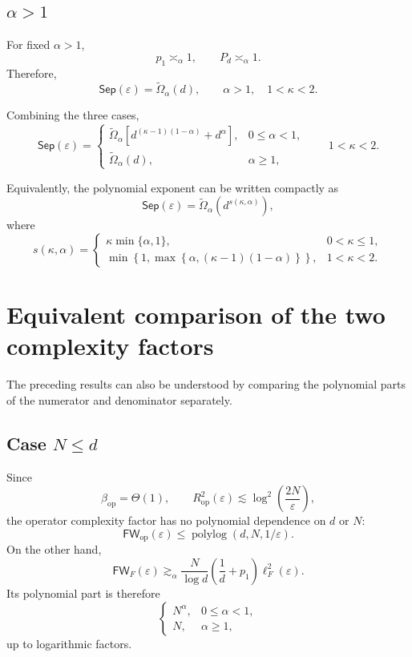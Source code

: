 \documentclass[11pt]{article}
\newcommand{\op}{\mathrm{op}}
\newcommand{\FW}{\mathsf{FW}}
\newcommand{\Sep}{\mathsf{Sep}}
\newcommand{\polylog}{\operatorname{polylog}}
\newcommand{\eps}{\varepsilon}
\begin{document}
\subsection{\texorpdfstring{$\alpha>1$}{alpha greater than one}}

For fixed $\alpha>1$,
\[
p_1\asymp_\alpha1, \qquad P_d\asymp_\alpha1.
\]
Therefore,
\begin{equation}
\boxed{
\Sep(\eps) = \widetilde\Omega_\alpha(d), \qquad \alpha>1,\quad 1<\kappa<2.
}
\label{eq:largeN-alpha-greater1}
\end{equation}

Combining the three cases,
\begin{equation}
\boxed{
\Sep(\eps) =
\begin{cases}
\widetilde\Omega_\alpha\left[ d^{(\kappa-1)(1-\alpha)}+d^\alpha \right], & 0\le\alpha<1, \\[2mm]
\widetilde\Omega_\alpha(d), & \alpha\ge1,
\end{cases}
\qquad
1<\kappa<2.
}
\label{eq:sep-kappa-large-final}
\end{equation}

Equivalently, the polynomial exponent can be written compactly as
\[
\Sep(\eps) = \widetilde\Omega_\alpha\left(d^{s(\kappa,\alpha)}\right),
\]
where
\begin{equation}
s(\kappa,\alpha) =
\begin{cases}
\kappa\min\{\alpha,1\}, &0<\kappa\le1, \\[2mm]
\min\left\{ 1, \max\left\{ \alpha, (\kappa-1)(1-\alpha) \right\} \right\}, &1<\kappa<2.
\end{cases}
\label{eq:separation-exponent}
\end{equation}

\section{Equivalent comparison of the two complexity factors}

The preceding results can also be understood by comparing the
polynomial parts of the numerator and denominator separately.

\subsection*{Case \(N\le d\)}

Since
\[
\beta_{\op}=\Theta(1), \qquad R_{\op}^2(\eps) \lesssim \log^2\left(\frac{2N}{\eps}\right),
\]
the operator complexity factor has no polynomial dependence on $d$ or
$N$:
\[
\FW_{\op}(\eps) \le \polylog(d,N,1/\eps).
\]
On the other hand,
\[
\FW_F(\eps) \gtrsim_\alpha \frac{N}{\log d} \left(\frac1d+p_1\right) \ell_F^2(\eps).
\]
Its polynomial part is therefore
\[
\begin{cases}
N^\alpha, & 0\le\alpha<1,\\
N, & \alpha\ge1,
\end{cases}
\]
up to logarithmic factors.
\end{document}
